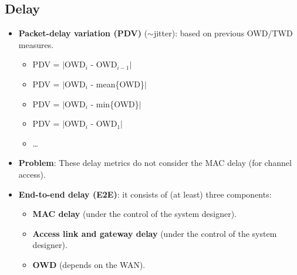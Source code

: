 \subsection{Delay}
\begin{itemize}
    \item \textbf{Packet-delay variation (PDV)} ($\sim$jitter): based on previous OWD/TWD measures.
    \begin{itemize}
        \item PDV = $|$OWD$_i$ - OWD$_{i-1}|$
        \item PDV = $|$OWD$_i$ - mean\{OWD\}$|$
        \item PDV = $|$OWD$_i$ - min\{OWD\}$|$
        \item PDV = $|$OWD$_i$ - OWD$_1|$
        \item \ldots
    \end{itemize}
    
    \item \textbf{Problem}: These delay metrics do not consider the MAC delay (for channel access).
    \item \textbf{End-to-end delay (E2E)}: it consists of (at least) three components:
    \begin{itemize}
        \item \textbf{MAC delay} (under the control of the system designer).
        \item \textbf{Access link and gateway delay} (under the control of the system designer).
        \item \textbf{OWD} (depends on the WAN).
    \end{itemize}
\end{itemize}

